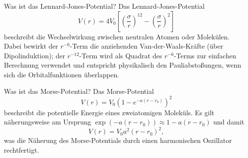 \begin{fquestion}{Was ist das Lennard-Jones-Potential?}
    Das Lennard-Jones-Potential 
    $$V(r) = 4 V_0 \left[\left(\frac{\sigma}{r}\right)^{12} - \left(\frac{\sigma}{r}\right)^2\right]$$
    beschreibt die Wechselwirkung zwischen neutralen Atomen oder Molekülen.
    Dabei bewirkt der $r^{-6}$-Term die anziehenden Van-der-Waals-Kräfte (über Dipolinduktion); der $r^{-12}$-Term wird als Quadrat des $r^{-6}$-Terms zur einfachen Berechnung verwendet und entspricht physikalisch den Pauliabstoßungen, wenn sich die Orbitalfunktionen überlappen.
    
    \begin{center}
    \end{center}
\end{fquestion}

\begin{fquestion}{Was ist das Morse-Potential?}
    Das Morse-Potential
    $$V(r) = V_0 \left(1 - e^{-a (r - r_0)}\right)^2$$
    beschreibt die potentielle Energie eines zweiatomigen Moleküls.
    Es gilt näherungsweise am Ursprung $\exp (-a (r - r_0)) \approx 1 - a (r - r_0)$ und damit
    $$V(r) = V_0 a^2 (r - r_0)^2,$$
    was die Näherung des Morse-Potentials durch einen harmonischen Oszillator rechtfertigt.
    \begin{center}
    \end{center}
\end{fquestion}

